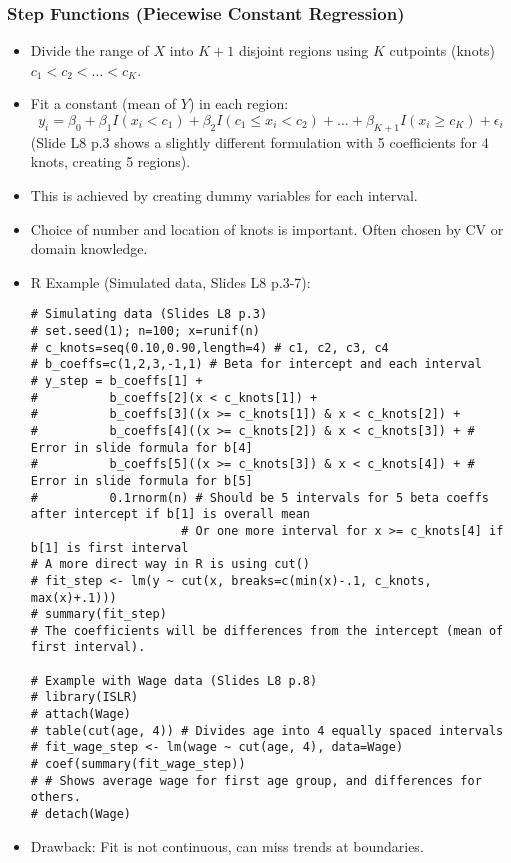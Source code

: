 \documentclass[12pt,a4paper]{article}
\begin{document}
\begin{itemize}
    \subsubsection{Step Functions (Piecewise Constant Regression) }
        \begin{itemize}
            \item Divide the range of $X$ into $K+1$ disjoint regions using $K$ cutpoints (knots) $c_1 < c_2 < \dots < c_K$.
            \item Fit a constant (mean of $Y$) in each region:
                $$ y_i = \beta_0 + \beta_1 I(x_i < c_1) + \beta_2 I(c_1 \le x_i < c_2) + \dots + \beta_{K+1} I(x_i \ge c_K) + \epsilon_i $$
                (Slide L8 p.3 shows a slightly different formulation with 5 coefficients for 4 knots, creating 5 regions).
            \item This is achieved by creating dummy variables for each interval.
            \item Choice of number and location of knots is important. Often chosen by CV or domain knowledge.
            \item R Example (Simulated data, Slides L8 p.3-7):
\begin{lstlisting}[caption={Piecewise Constant Regression (Step Function) in R}]
# Simulating data (Slides L8 p.3)
# set.seed(1); n=100; x=runif(n)
# c_knots=seq(0.10,0.90,length=4) # c1, c2, c3, c4
# b_coeffs=c(1,2,3,-1,1) # Beta for intercept and each interval
# y_step = b_coeffs[1] + 
#          b_coeffs[2](x < c_knots[1]) + 
#          b_coeffs[3]((x >= c_knots[1]) & x < c_knots[2]) +
#          b_coeffs[4]((x >= c_knots[2]) & x < c_knots[3]) + # Error in slide formula for b[4]
#          b_coeffs[5]((x >= c_knots[3]) & x < c_knots[4]) + # Error in slide formula for b[5]
#          0.1rnorm(n) # Should be 5 intervals for 5 beta coeffs after intercept if b[1] is overall mean
                     # Or one more interval for x >= c_knots[4] if b[1] is first interval
# A more direct way in R is using cut()
# fit_step <- lm(y ~ cut(x, breaks=c(min(x)-.1, c_knots, max(x)+.1)))
# summary(fit_step)
# The coefficients will be differences from the intercept (mean of first interval).

# Example with Wage data (Slides L8 p.8)
# library(ISLR)
# attach(Wage)
# table(cut(age, 4)) # Divides age into 4 equally spaced intervals
# fit_wage_step <- lm(wage ~ cut(age, 4), data=Wage)
# coef(summary(fit_wage_step))
# # Shows average wage for first age group, and differences for others.
# detach(Wage)
\end{lstlisting}
            \item Drawback: Fit is not continuous, can miss trends at boundaries.
        \end{itemize}


\end{itemize}
\end{document}
